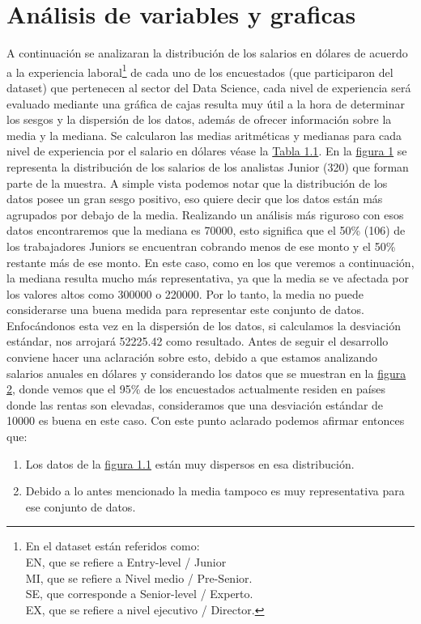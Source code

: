 \documentclass{article}
\begin{document}
	\section{Análisis de variables y graficas}
	A continuación se analizaran la distribución de los salarios en dólares de acuerdo a la experiencia laboral\footnote{En el dataset están referidos como:
		\\EN, que se refiere a Entry-level / Junior
		\\MI, que se refiere a Nivel medio / Pre-Senior.
		\\SE, que corresponde a Senior-level / Experto.
		\\EX, que se refiere a nivel ejecutivo / Director.} de cada uno de los encuestados (que participaron del dataset) que pertenecen al sector del Data Science, cada nivel de experiencia será evaluado mediante una gráfica de cajas resulta muy útil a la hora de determinar los sesgos y la dispersión de los datos, además de ofrecer información sobre la media y la mediana. Se calcularon las medias aritméticas y medianas para cada nivel de experiencia por el salario en dólares véase la \hyperref[tabla 1.1]{Tabla 1.1}.
	En la \hyperref[figura 1.1 diagrama]{figura 1} se representa la distribución de los salarios de los analistas Junior (320) que forman parte de la muestra. A simple vista podemos notar que la distribución de los datos posee un gran sesgo positivo, eso quiere decir que los datos están más agrupados por debajo de la media.
	Realizando un análisis más riguroso con esos datos encontraremos que la mediana es 70000, esto significa que el 50\% (106) de los trabajadores Juniors se encuentran cobrando menos de ese monto y el 50\% restante más de ese monto. En este caso, como en los que veremos a continuación, la mediana resulta mucho más representativa, ya que la media se ve afectada por los valores altos como 300000 o 220000. Por lo tanto, la media no puede considerarse una buena medida para representar este conjunto de datos.
	Enfocándonos esta vez en la dispersión de los datos, si calculamos la desviación estándar, nos arrojará 52225.42 como resultado. Antes de seguir el desarrollo conviene hacer una aclaración sobre esto, debido a que estamos analizando salarios anuales en dólares y considerando los datos que se muestran en la \hyperref[figura 2 torta]{figura 2}, donde vemos que el 95\% de los encuestados actualmente residen en países donde las rentas son elevadas, consideramos que una desviación estándar de 10000 es buena en este caso.
	Con este punto aclarado podemos afirmar entonces que: 
	\begin{enumerate}
		\item Los datos de la \hyperref[figura 1.1 diagrama]{figura 1.1} están muy dispersos en esa distribución.
		\item Debido a lo antes mencionado la media tampoco es muy representativa para ese conjunto de datos.
	\end{enumerate}
\end{document}
